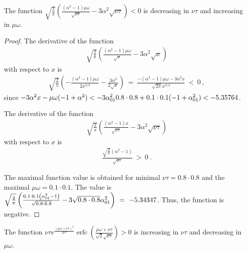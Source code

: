\documentclass{article}
\DeclareMathOperator{\erfc}{erfc}
\begin{document}
\begin{lemma}
\label{lem:F6}

The function
$\sqrt{\frac{2}{\pi }} \left(\frac{\left(\alpha ^2-1\right) \mu \omega}{\sqrt{\nu \tau}}-3 \alpha ^2 \sqrt{\nu \tau}\right)<0$ 
is decreasing in $\nu \tau$ and increasing in $\mu \omega$.
\end{lemma}
\begin{proof}
The derivative of the function
\begin{align}
\sqrt{\frac{2}{\pi }} \left(\frac{\left(\alpha ^2-1\right) \mu \omega}{\sqrt{x}}-3 \alpha ^2 \sqrt{x}\right)
\end{align}
with respect to $x$ is
\begin{align}
\sqrt{\frac{2}{\pi }} \left(-\frac{\left(\alpha^2-1\right) \mu
  \omega}{2 x^{3/2}}-\frac{3 \alpha ^2}{2 \sqrt{x}}\right)
\ = \ 
\frac{-\left(\alpha^2-1\right) \mu \omega-3 \alpha^2 x}{\sqrt{2 \pi } x^{3/2}} \ < \ 0 \ ,
\end{align}
since 
$-3 \alpha^2 x - \mu \omega (-1+\alpha^2)< -3 \alpha_{\rm 01}^2 0.8 \cdot 0.8+0.1 \cdot 0.1 (-1+\alpha_{\rm 01}^2)<-5.35764$.

The derivative of the function
\begin{align}
\sqrt{\frac{2}{\pi }} \left(\frac{\left(\alpha ^2-1\right) x}{\sqrt{\nu \tau}}-3 \alpha ^2 \sqrt{\nu \tau}\right)
\end{align}
with respect to $x$ is
\begin{align}
\frac{\sqrt{\frac{2}{\pi }} \left(\alpha ^2-1\right)}{\sqrt{\nu \tau}} \ > \ 0 \ .
\end{align}

The maximal function value is obtained for 
minimal $\nu
\tau=0.8 \cdot 0.8$ and the maximal  $\mu \omega=0.1 \cdot 0.1$. 
The value is
$\sqrt{\frac{2}{\pi }} \left(\frac{0.1 \cdot 0.1 \left(\alpha_{\rm 01}^2-1\right)}
{\sqrt{0.8 \cdot 0.8}}-3 \sqrt{0.8 \cdot 0.8} \alpha_{\rm 01}^2\right)
\ = \ -5.34347$.
Thus, the function is negative.
\end{proof}

\begin{lemma}[Function $\nu \tau e^{\frac{(\mu \omega+\nu \tau)^2}{2 \nu \tau}} 
\erfc \left(\frac{\mu \omega+\nu \tau}{\sqrt{2} \sqrt{\nu \tau}}\right)$]
\label{lem:F7}

The function 
 $\nu \tau e^{\frac{(\mu \omega+\nu \tau)^2}{2
     \nu \tau}} \erfc \left(\frac{\mu
     \omega+\nu \tau}{\sqrt{2} \sqrt{\nu
       \tau}}\right)>0$ 
is increasing in $\nu \tau$ and decreasing in $\mu \omega$.
\end{lemma}
\end{document}

